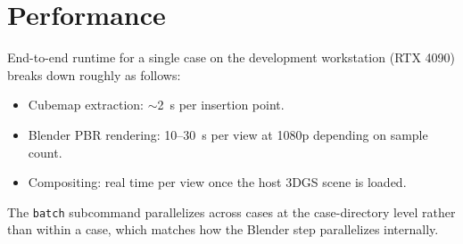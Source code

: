 \section{Performance}

End-to-end runtime for a single case on the development workstation
(RTX 4090) breaks down roughly as follows:

\begin{itemize}
  \item Cubemap extraction: $\sim$2~s per insertion point.
  \item Blender PBR rendering: 10--30~s per view at 1080p depending on
        sample count.
  \item Compositing: real time per view once the host 3DGS scene is
        loaded.
\end{itemize}

The \texttt{batch} subcommand parallelizes across cases at the
case-directory level rather than within a case, which matches how the
Blender step parallelizes internally.
